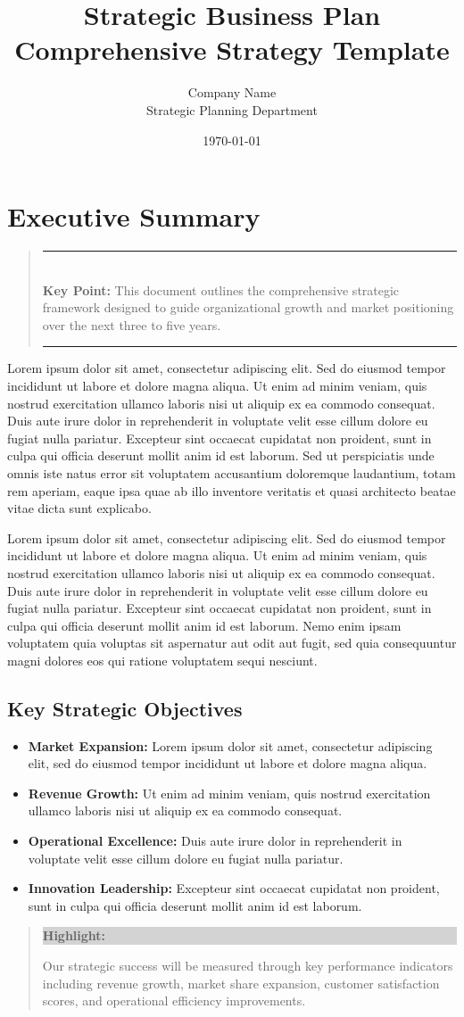 \documentclass[11pt,a4paper]{article}
\title{
  \vspace{-2cm}
  \textcolor{primary}{\Huge\bfseries Strategic Business Plan}\\
  \vspace{0.5cm}
  \textcolor{secondary}{\Large Comprehensive Strategy Template}
  \vspace{1cm}
}
\author{
  \textcolor{secondary}{\Large Company Name}\\
  \textcolor{secondary}{\normalsize Strategic Planning Department}
}
\date{\textcolor{secondary}{\today}}
\newcommand{\loremtext}[1]{%
  Lorem ipsum dolor sit amet, consectetur adipiscing elit. Sed do eiusmod tempor incididunt ut labore et dolore magna aliqua. Ut enim ad minim veniam, quis nostrud exercitation ullamco laboris nisi ut aliquip ex ea commodo consequat. Duis aute irure dolor in reprehenderit in voluptate velit esse cillum dolore eu fugiat nulla pariatur. Excepteur sint occaecat cupidatat non proident, sunt in culpa qui officia deserunt mollit anim id est laborum.%
}
\newenvironment{keypoint}%
{\begin{quote}\textcolor{accent}{\rule{\textwidth}{2pt}}\vspace{0.2em}\\\textbf{Key Point:} }%
{\vspace{0.2em}\\\textcolor{accent}{\rule{\textwidth}{2pt}}\end{quote}}
\newenvironment{highlight}%
{\begin{quote}\colorbox{lightgray}{\parbox{\dimexpr\linewidth-2\fboxsep}{\textbf{Highlight:} }}}%
{\end{quote}}
\begin{document}
\maketitle
\thispagestyle{empty}

\newpage
\tableofcontents
\newpage

\section{Executive Summary}

\begin{keypoint}
This document outlines the comprehensive strategic framework designed to guide organizational growth and market positioning over the next three to five years.
\end{keypoint}

\loremtext{1} Sed ut perspiciatis unde omnis iste natus error sit voluptatem accusantium doloremque laudantium, totam rem aperiam, eaque ipsa quae ab illo inventore veritatis et quasi architecto beatae vitae dicta sunt explicabo. 

\loremtext{2} Nemo enim ipsam voluptatem quia voluptas sit aspernatur aut odit aut fugit, sed quia consequuntur magni dolores eos qui ratione voluptatem sequi nesciunt.

\subsection{Key Strategic Objectives}

\begin{itemize}
  \item \textbf{Market Expansion:} Lorem ipsum dolor sit amet, consectetur adipiscing elit, sed do eiusmod tempor incididunt ut labore et dolore magna aliqua.
  \item \textbf{Revenue Growth:} Ut enim ad minim veniam, quis nostrud exercitation ullamco laboris nisi ut aliquip ex ea commodo consequat.
  \item \textbf{Operational Excellence:} Duis aute irure dolor in reprehenderit in voluptate velit esse cillum dolore eu fugiat nulla pariatur.
  \item \textbf{Innovation Leadership:} Excepteur sint occaecat cupidatat non proident, sunt in culpa qui officia deserunt mollit anim id est laborum.
\end{itemize}

\begin{highlight}
Our strategic success will be measured through key performance indicators including revenue growth, market share expansion, customer satisfaction scores, and operational efficiency improvements.
\end{highlight}
\end{document}

